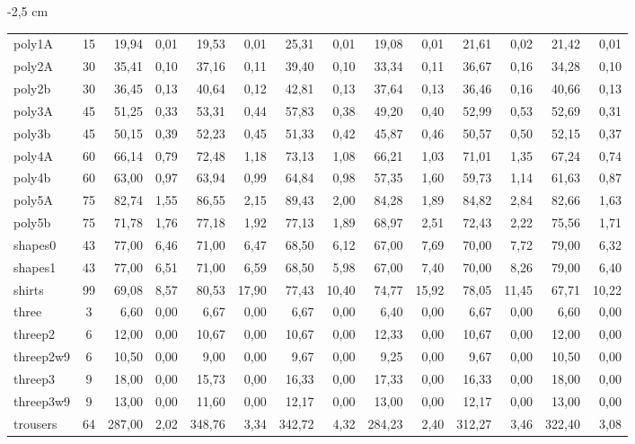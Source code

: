 \documentclass[12pt, openright, twoside, a4paper, english, brazilian]{USPSC-classe/USPSC}
\newcommand{\lgray}{\cellcolor{lightgray}}
\begin{document}
\begin{adjustwidth}{-2 cm}{-2,5 cm}
\begin{threeparttable}[!htb]
{\begin{tabular}{|l|c|rr|rr|rr|rr|rr|rr|}
            poly1A &15  &19,94 &0,01  &19,53 &0,01  &25,31 &0,01  &19,08 &0,01  &21,61 &0,02  &21,42 &0,01 \\
            poly2A &30  &35,41 &0,10  &37,16 &0,11  &39,40 &0,10  &33,34 &0,11  &36,67 &0,16  &34,28 &0,10 \\
            poly2b &30  &36,45 &0,13  &40,64 &0,12  &42,81 &0,13  &37,64 &0,13  &36,46 &0,16  &40,66 &0,13 \\
            poly3A &45  &51,25 &0,33  &53,31 &0,44  &57,83 &0,38  &\lgray49,20 &0,40  &52,99 &0,53  &52,69 &0,31 \\
            poly3b &45  &50,15 &0,39  &52,23 &0,45  &51,33 &0,42  &45,87 &0,46  &50,57 &0,50  &52,15 &0,37 \\
            poly4A &60  &\lgray66,14 &0,79  &72,48 &1,18  &73,13 &1,08  &66,21 &1,03  &71,01 &1,35  &67,24 &0,74 \\
            poly4b &60  &63,00 &0,97  &63,94 &0,99  &64,84 &0,98  &57,35 &1,60  &59,73 &1,14  &61,63 &0,87 \\
            poly5A &75  &82,74 &1,55  &86,55 &2,15  &89,43 &2,00  &84,28 &1,89  &84,82 &2,84  &82,66 &1,63 \\
            poly5b &75  &71,78 &1,76  &77,18 &1,92  &77,13 &1,89  &68,97 &2,51  &72,43 &2,22  &75,56 &1,71 \\
            shapes0 &43  &77,00 &6,46  &71,00 &6,47  &68,50 &6,12  &67,00 &7,69  &70,00 &7,72  &79,00 &6,32 \\
            shapes1 &43  &77,00 &6,51  &71,00 &6,59  &68,50 &5,98  &67,00 &7,40  &70,00 &8,26  &79,00 &6,40 \\
            shirts &99  &69,08 &8,57  &80,53 &17,90  &77,43 &10,40  &74,77 &15,92  &78,05 &11,45  &67,71 &10,22 \\
            three &3  &6,60 &0,00  &6,67 &0,00  &6,67 &0,00  &6,40 &0,00  &6,67 &0,00  &6,60 &0,00 \\
            threep2 &6  &12,00 &0,00  &10,67 &0,00  &10,67 &0,00  &12,33 &0,00  &10,67 &0,00  &12,00 &0,00 \\
            threep2w9 &6  &10,50 &0,00  &9,00 &0,00  &9,67 &0,00  &9,25 &0,00  &9,67 &0,00  &10,50 &0,00 \\
            threep3 &9  &18,00 &0,00  &\lgray15,73 &0,00  &16,33 &0,00  &17,33 &0,00  &16,33 &0,00  &18,00 &0,00 \\
            threep3w9 &9  &13,00 &0,00  &\lgray11,60 &0,00  &12,17 &0,00  &13,00 &0,00  &12,17 &0,00  &13,00 &0,00 \\
            trousers &64  &287,00 &2,02  &348,76 &3,34  &342,72 &4,32  &284,23 &2,40  &312,27 &3,46  &322,40 &3,08 \\
            \hline
        \end{tabular}
    }
    \label{tab:t2}
\end{threeparttable}\end{adjustwidth}
\end{document}
